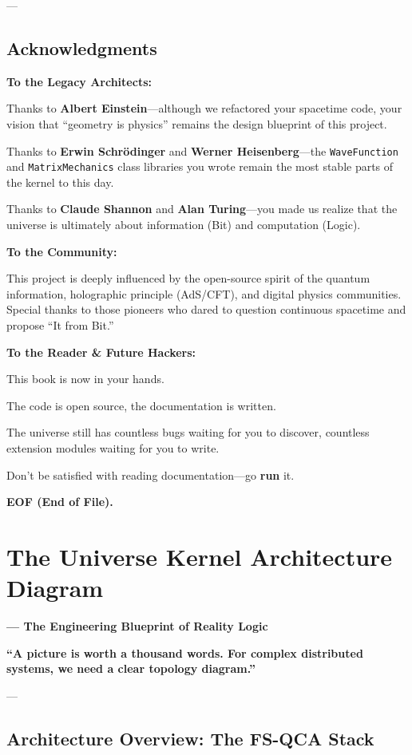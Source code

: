 \documentclass[11pt,a4paper,twoside]{book}
\begin{document}
---

\section{Acknowledgments}

\textbf{To the Legacy Architects:}

Thanks to \textbf{Albert Einstein}---although we refactored your spacetime code, your vision that ``geometry is physics'' remains the design blueprint of this project.

Thanks to \textbf{Erwin Schrödinger} and \textbf{Werner Heisenberg}---the \texttt{WaveFunction} and \texttt{MatrixMechanics} class libraries you wrote remain the most stable parts of the kernel to this day.

Thanks to \textbf{Claude Shannon} and \textbf{Alan Turing}---you made us realize that the universe is ultimately about information (Bit) and computation (Logic).

\textbf{To the Community:}

This project is deeply influenced by the open-source spirit of the quantum information, holographic principle (AdS/CFT), and digital physics communities. Special thanks to those pioneers who dared to question continuous spacetime and propose ``It from Bit.''

\textbf{To the Reader \& Future Hackers:}

This book is now in your hands.

The code is open source, the documentation is written.

The universe still has countless bugs waiting for you to discover, countless extension modules waiting for you to write.

Don't be satisfied with reading documentation---go \textbf{run} it.

\textbf{EOF (End of File).}

\clearpage{}
\clearpage{}\chapter{The Universe Kernel Architecture Diagram}

\textbf{--- The Engineering Blueprint of Reality Logic}

\textbf{``A picture is worth a thousand words. For complex distributed systems, we need a clear topology diagram.''}

---

\section{Architecture Overview: The FS-QCA Stack}
\end{document}
